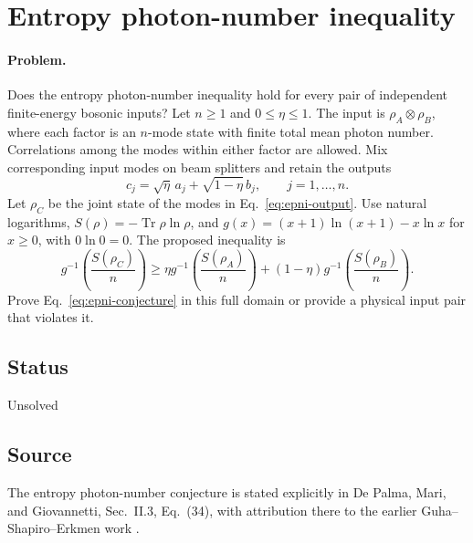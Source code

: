 \section{Entropy photon-number inequality}
\label{sec:op_ba39e7a80122b256}

\paragraph{Problem.}
Does the entropy photon-number inequality hold for every pair of independent finite-energy bosonic inputs?
Let $n\geq1$ and $0\leq\eta\leq1$. The input is $\rho_A\otimes\rho_B$, where each factor is an $n$-mode state with finite total mean photon number. Correlations among the modes within either factor are allowed. Mix corresponding input modes on beam splitters and retain the outputs
\begin{equation}
 c_j=\sqrt\eta\,a_j+\sqrt{1-\eta}\,b_j,\qquad j=1,\ldots,n.
 \label{eq:epni-output}
\end{equation}
Let $\rho_C$ be the joint state of the modes in Eq.~\eqref{eq:epni-output}. Use natural logarithms, $S(\rho)=-\operatorname{Tr}\rho\ln\rho$, and $g(x)=(x+1)\ln(x+1)-x\ln x$ for $x\geq0$, with $0\ln0=0$. The proposed inequality is
\begin{equation}
 g^{-1}\!\left(\frac{S(\rho_C)}n\right)
 \geq\eta g^{-1}\!\left(\frac{S(\rho_A)}n\right)
 +(1-\eta)g^{-1}\!\left(\frac{S(\rho_B)}n\right).
 \label{eq:epni-conjecture}
\end{equation}
Prove Eq.~\eqref{eq:epni-conjecture} in this full domain or provide a physical input pair that violates it.

\subsection*{Status}

Unsolved

\subsection*{Source}

The entropy photon-number conjecture is stated explicitly in De Palma, Mari, and Giovannetti, Sec.~II.3, Eq.~(34), with attribution there to the earlier Guha--Shapiro--Erkmen work .

